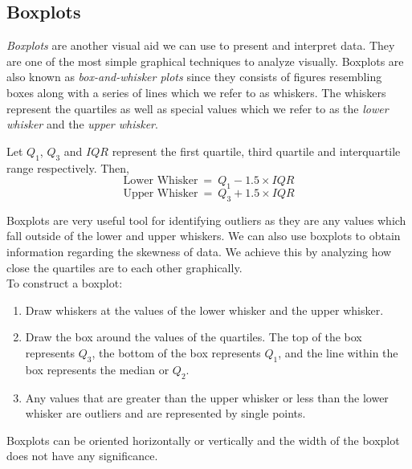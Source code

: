 \subsection{Boxplots}\label{sectionBoxplots}

\textit{Boxplots} are another visual aid we can use to present and interpret data.
They are one of the most simple graphical techniques to analyze visually.
Boxplots are also known as \textit{box-and-whisker plots} since they consists of
figures resembling boxes along with a series of lines which we refer to as whiskers.
The whiskers represent the quartiles as well as special values which we refer to as
the \textit{lower whisker} and the \textit{upper whisker}.\\

\begin{definition}
Let $Q_{1}$, $Q_{3}$ and $IQR$ represent the first quartile, third quartile and 
interquartile range respectively. Then,
\[ \text{Lower Whisker} ~ = ~ Q_{1} - 1.5 \times IQR \]
\[ \text{Upper Whisker} ~ = ~ Q_{3} + 1.5 \times IQR \]
\end{definition}

\noindent
Boxplots are very useful tool for identifying outliers as they are any values which fall outside of the lower and upper whiskers. We can also use boxplots to obtain information regarding the skewness of data. We achieve this by analyzing how close the quartiles are to each other graphically.\\

\noindent
To construct a boxplot:
\begin{enumerate}
\item Draw whiskers at the values
of the lower whisker and the upper whisker.
\item Draw the box around the values of the quartiles. The top of the box represents $Q_3$, the bottom of the box represents $Q_1$, and the line within the box represents the median or $Q_2$.
\item Any values that are greater than the upper whisker or less than the lower whisker are outliers and are represented by single points.
\end{enumerate}

\begin{nt}
Boxplots can be oriented horizontally or vertically and the width of the boxplot does not have any significance.
\end{nt}

